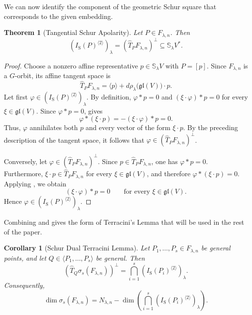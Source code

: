 \documentclass[a4paper,reqno]{amsart}
\theoremstyle{plainnopunct}
\newtheorem{theorem}{Theorem}[section]
\newtheorem{corollary}[corollary]{Corollary}
\theoremstyle{definitionnopunct}
\renewcommand{\S}{\mathbb{S}}
\newcommand{\Lie}{\mathfrak}
\begin{document}
We can now identify the component of the geometric Schur square that corresponds to the given embedding.

\begin{theorem}[Tangential Schur Apolarity]
\label{thm: tangential Schur apolarity}
Let $P\in F_{\lambda,n}$. Then
\[\left(
I_{\mathrm S}(P)^{\langle2\rangle}
\right)_\lambda
=
\left(
\widehat T_PF_{\lambda,n}
\right)^\perp
\subseteq
\S_\lambda V^*.
\]
\end{theorem}

\begin{proof}
Choose a nonzero affine representative $p\in\S_\lambda V$ with  $P=[p]$.
Since $F_{\lambda,n}$ is a $G$-orbit, its affine tangent space is
\[\widehat T_PF_{\lambda,n}
=
\langle p\rangle
+
d\rho_\lambda\bigl(\Lie{gl}(V)\bigr)\cdot p.
\]
Let first $\varphi
\in
\left(
I_{\mathrm S}(P)^{\langle2\rangle}
\right)_\lambda$. By definition, $\varphi*p=0$ and $(\xi\cdot\varphi)*p=0$ for every $\xi\in\Lie{gl}(V)$. Since $\varphi*p=0$,
 gives
\[
\varphi*(\xi\cdot p)
=
-
(\xi\cdot\varphi)*p
=
0.
\]
Thus, $\varphi$ annihilates both $p$ and every vector of the form $\xi\cdot p$. By the preceding description of the tangent space, it follows that
$\varphi
\in
\left(
\widehat T_PF_{\lambda,n}
\right)^\perp$.

Conversely, let
$\varphi
\in
\left(
\widehat T_PF_{\lambda,n}
\right)^\perp$.
Since $p\in\widehat T_PF_{\lambda,n}$, one has $\varphi*p=0$. Furthermore, $\xi\cdot p
\in
\widehat T_PF_{\lambda,n}$ for every $\xi\in\Lie{gl}(V)$, and therefore $\varphi*(\xi\cdot p)=0$.
Applying
, we obtain
\[
(\xi\cdot\varphi)*p=0
\qquad
\text{for every }\xi\in\Lie{gl}(V).
\]
Hence $\varphi
\in
\left(
I_{\mathrm S}(P)^{\langle2\rangle}
\right)_\lambda$.
\end{proof}

Combining  and  gives the form of Terracini's Lemma that will be used in the rest of the paper.

\begin{corollary}[Schur Dual Terracini Lemma]
\label{cor: schur dual terracini}
Let $P_1,\ldots,P_s
\in
F_{\lambda,n}$ be general points, and let $Q
\in
\langle P_1,\ldots,P_s\rangle$ be general. Then
\[\left(
\widehat T_Q\sigma_s(F_{\lambda,n})
\right)^\perp
=
\bigcap_{i=1}^s
\left(
I_{\mathrm S}(P_i)^{\langle2\rangle}
\right)_\lambda.
\]Consequently,
\[\dim\sigma_s(F_{\lambda,n})
=
N_{\lambda,n}
-
\dim
\left(
\bigcap_{i=1}^s
\left(
I_{\mathrm S}(P_i)^{\langle2\rangle}
\right)_\lambda
\right).\]\end{corollary}
\end{document}
